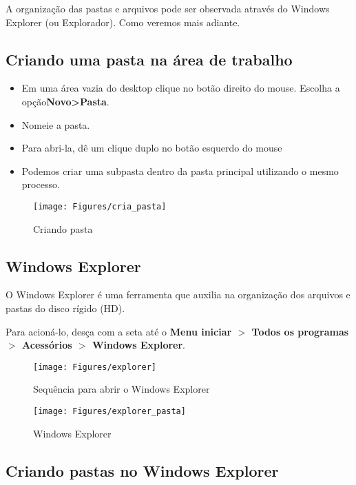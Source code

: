 \documentclass[hidelinks,12pt]{article}
\begin{document}
	A organização das pastas e arquivos pode ser observada através do Windows Explorer (ou Explorador). Como veremos mais adiante.
	
	\subsection{Criando uma pasta na área de trabalho}
	
	\begin{itemize}
		\item Em uma área vazia do desktop clique no botão direito do mouse. Escolha a opção{\bf Novo>Pasta}.
		\item Nomeie a pasta.
		\item Para abri-la, dê um clique duplo no botão esquerdo do mouse
		\item Podemos criar uma subpasta dentro da pasta principal utilizando o mesmo processo.
	\end{itemize}
	
		\begin{figure}[!h]
			\centering
			\texttt{[image: Figures/cria\_pasta]}
			\caption{Criando pasta}
			\label{fig:criando pasta}
		\end{figure}
		
	\subsection{Windows Explorer}
	
		O Windows Explorer é uma ferramenta que auxilia na organização dos arquivos e pastas do disco rígido (HD).	
		
		Para acioná-lo, desça com a seta até o {\bf Menu iniciar $>$ Todos os programas $>$ Acessórios $>$ Windows Explorer}.
	
		\begin{figure}[!h]
			\centering
			\texttt{[image: Figures/explorer]}
			\caption{Sequência para abrir o Windows Explorer}
			\label{fig:explorer}
		\end{figure}
		
			
			\begin{figure}[!h]
				\centering
				\texttt{[image: Figures/explorer\_pasta]}
				\caption{Windows Explorer}
				\label{fig:explorer_p}
			\end{figure}
			
		\newpage	
		\subsection{Criando pastas no Windows Explorer}
		
\end{document}

